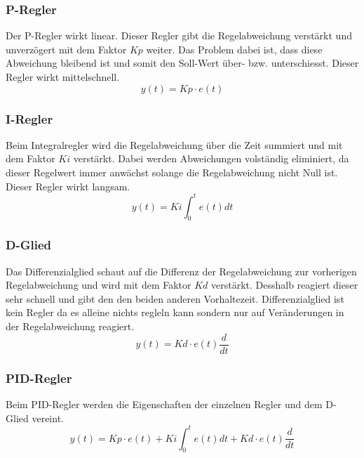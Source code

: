 \documentclass[12pt,a4paper, ngerman]{article}
\begin{document}
\subsubsection{P-Regler}
Der P-Regler wirkt linear. Dieser Regler gibt die Regelabweichung verstärkt und unverzögert mit dem Faktor $Kp$ weiter. Das Problem dabei ist, dass diese Abweichung bleibend ist und somit den Soll-Wert über- bzw. unterschiesst. Dieser Regler wirkt mittelschnell.\cite{website:rn-wissen_Regelungstechnik}
\begin{equation}
y(t)=Kp\cdot e(t)
\end{equation}

\subsubsection{I-Regler}
Beim Integralregler wird die Regelabweichung über die Zeit summiert und mit dem Faktor $Ki$ verstärkt. Dabei werden Abweichungen volständig eliminiert, da dieser Regelwert immer anwächst solange die Regelabweichung nicht Null ist. Dieser Regler wirkt langsam.\cite{website:rn-wissen_Regelungstechnik}\\
\begin{equation}
y(t)=Ki\int_{0}^{t}e(t)dt
\end{equation}

\subsubsection{D-Glied}
Das Differenzialglied schaut auf die Differenz der Regelabweichung zur vorherigen Regelabweichung und wird mit dem Faktor $Kd$ verstärkt. Desshalb reagiert dieser sehr schnell und gibt den den beiden anderen Vorhaltezeit. Differenzialglied ist kein Regler da es alleine nichts regleln kann sondern nur auf Veränderungen in der Regelabweichung reagiert.\cite{website:rn-wissen_Regelungstechnik}\\
\begin{equation}
y(t)=Kd\cdot e(t)\frac{d}{dt}
\end{equation}

\subsubsection{PID-Regler}
Beim PID-Regler werden die Eigenschaften der einzelnen Regler und dem D-Glied vereint.
\begin{equation}
y(t)=Kp\cdot e(t)+Ki\int_{0}^{t}e(t)dt+Kd\cdot e(t)\frac{d}{dt}
\end{equation}
\newpage
\end{document}
